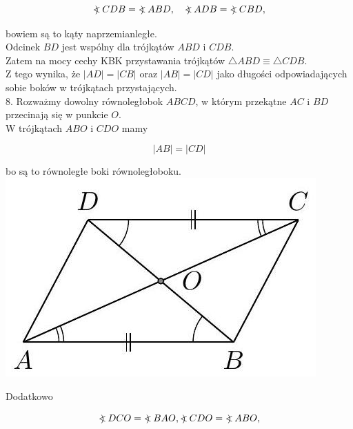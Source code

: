 \documentclass[10pt]{article}
\newcommand\Varangle{\mathop{{<\!\!\!\!\!\text{\small)}}\:}\nolimits}
\begin{document}
\[
\Varangle C D B=\Varangle A B D, \quad \Varangle A D B=\Varangle C B D,
\]

bowiem są to kąty naprzemianległe.\\
Odcinek \(B D\) jest wspólny dla trójkątów \(A B D\) i \(C D B\).\\
Zatem na mocy cechy KBK przystawania trójkątów \(\triangle A B D \equiv \triangle C D B\).\\
Z tego wynika, że \(|A D|=|C B|\) oraz \(|A B|=|C D|\) jako długości odpowiadających sobie boków w trójkątach przystających.\\
8. Rozważmy dowolny równoległobok \(A B C D\), w którym przekątne \(A C\) i \(B D\) przecinają się w punkcie \(O\).\\
W trójkątach \(A B O\) i \(C D O\) mamy

\[
|A B|=|C D|
\]

bo są to równoległe boki równoległoboku.\\
\includegraphics[max width=\textwidth, center]{2024_11_21_71f62bd117d375398909g-060(1)}

Dodatkowo

\[
\Varangle D C O=\Varangle B A O, \Varangle C D O=\Varangle A B O,
\]
\end{document}
